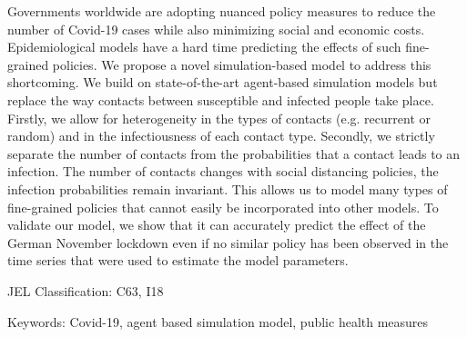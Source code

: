 \noindent Governments worldwide are adopting nuanced policy measures to reduce the
number of Covid-19 cases while also  minimizing social and economic costs.
Epidemiological models have a hard time predicting the effects of such fine-grained
policies. We propose a novel simulation-based model to address this shortcoming. We
build on state-of-the-art agent-based simulation models but replace the way contacts
between susceptible and infected people take place. Firstly, we allow for heterogeneity
in the types of contacts (e.g. recurrent or random) and in the infectiousness of each
contact type. Secondly, we strictly separate the number of contacts from the
probabilities that a contact leads to an infection. The number of contacts changes with
social distancing policies, the infection probabilities remain invariant. This allows us
to model many types of fine-grained policies that cannot easily be incorporated into
other models. To validate our model, we show that it can accurately predict the effect
of the German November lockdown even if no similar policy has been observed in the time
series that were used to estimate the model parameters.

\vspace{1cm}
\noindent JEL Classification: C63, I18

\noindent Keywords: Covid-19, agent based simulation model, public health measures
